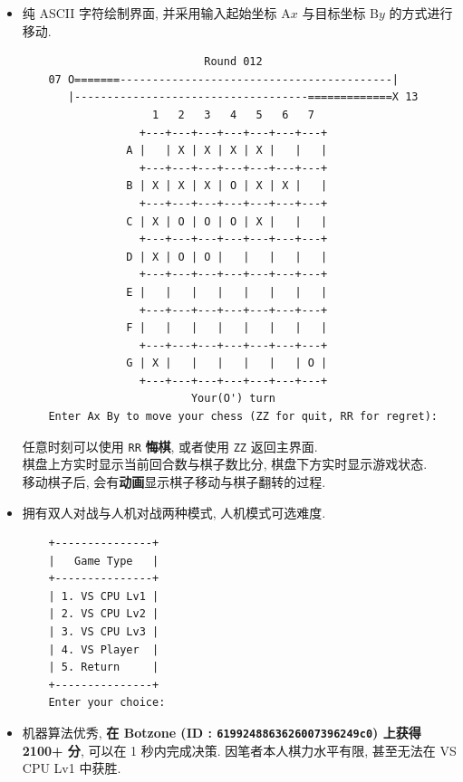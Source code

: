 \documentclass[12pt]{article}
\begin{document}
\begin{itemize}
    \item 纯 ASCII 字符绘制界面, 并采用输入起始坐标 $\mathrm Ax$ 与目标坐标 $\mathrm By$ 的方式进行移动.
    \begin{verbatim}
                            Round 012
    07 O=======------------------------------------------|
       |------------------------------------=============X 13
                    1   2   3   4   5   6   7
                  +---+---+---+---+---+---+---+
                A |   | X | X | X | X |   |   |
                  +---+---+---+---+---+---+---+
                B | X | X | X | O | X | X |   |
                  +---+---+---+---+---+---+---+
                C | X | O | O | O | X |   |   |
                  +---+---+---+---+---+---+---+
                D | X | O | O |   |   |   |   |
                  +---+---+---+---+---+---+---+
                E |   |   |   |   |   |   |   |
                  +---+---+---+---+---+---+---+
                F |   |   |   |   |   |   |   |
                  +---+---+---+---+---+---+---+
                G | X |   |   |   |   |   | O |
                  +---+---+---+---+---+---+---+
                          Your(O') turn
    Enter Ax By to move your chess (ZZ for quit, RR for regret): \end{verbatim}
    任意时刻可以使用 \texttt{RR} \textbf{悔棋}, 或者使用 \texttt{ZZ} 返回主界面. \\
    棋盘上方实时显示当前回合数与棋子数比分, 棋盘下方实时显示游戏状态. \\
    移动棋子后, 会有\textbf{动画}显示棋子移动与棋子翻转的过程.

    \item 拥有双人对战与人机对战两种模式, 人机模式可选难度.
    \begin{verbatim}
    +---------------+
    |   Game Type   |
    +---------------+
    | 1. VS CPU Lv1 |
    | 2. VS CPU Lv2 |
    | 3. VS CPU Lv3 |
    | 4. VS Player  |
    | 5. Return     |
    +---------------+
    Enter your choice: \end{verbatim}

    \item 机器算法优秀, \textbf{在 Botzone (ID : \texttt{6199248863626007396249c0}) 上获得 2100+ 分}, 可以在 1 秒内完成决策. 因笔者本人棋力水平有限, 甚至无法在 VS CPU Lv1 中获胜.

    \newpage


\end{itemize}
\end{document}
